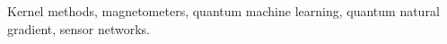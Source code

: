 Kernel methods, magnetometers, quantum machine learning, quantum natural gradient, sensor networks.
